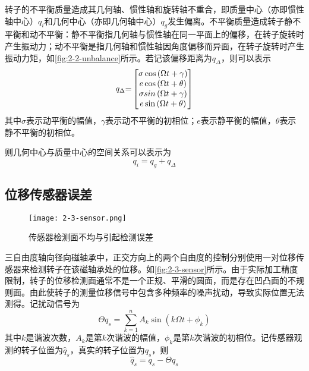 转子的不平衡质量造成其几何轴、惯性轴和旋转轴不重合，即质量中心（亦即惯性轴中心）$ q_i $和几何中心（亦即几何轴中心）$ q_g $发生偏离。不平衡质量造成转子静不平衡和动不平衡：静不平衡指几何轴与惯性轴在同一平面上的偏移，在转子旋转时产生振动力；动不平衡是指几何轴和惯性轴因角度偏移而异面，在转子旋转时产生振动力矩，如\autoref{fig:2-2-unbalance}所示。若记该偏移距离为$ q_{\Delta} $，则可以表示
\begin{equation}
\label{eq:q_delta}
{{q}_\Delta }{ = }\left[ 
{\begin{matrix}
   {\sigma \cos \left( {\Omega t + \gamma } \right)}  \cr 
   {e\cos \left( {\Omega t + \theta } \right)}  \cr 
   {\sigma sin\left( {\Omega t + \gamma } \right)}  \cr 
   {e\sin \left( {\Omega t + \theta } \right)}  \cr 
\end{matrix}} 
 \right]
\end{equation}
其中$\sigma$表示动平衡的幅值，$\gamma$表示动不平衡的初相位；$e$表示静平衡的幅值，$\theta$表示静不平衡的初相位。

则几何中心与质量中心的空间关系可以表示为
\begin{equation}
{{q}_i}{ = }{{q}_{g}} + {{q}_\Delta }
\end{equation}

\subsection{位移传感器误差}
\begin{figure}
	\texttt{[image: 2-3-sensor.png]}
	\caption{传感器检测面不均与引起检测误差}
	\label{fig:2-3-sensor}
\end{figure}
三自由度轴向径向磁轴承中，正交方向上的两个自由度的控制分别使用一对位移传感器来检测转子在该磁轴承处的位移。如\autoref{fig:2-3-sensor}所示。由于实际加工精度限制，转子的位移检测面通常不是一个正规、平滑的圆面，而是存在凹凸面的不规则面。由此使转子的测量位移信号中包含多种频率的噪声扰动，导致实际位置无法测得。记扰动信号为
\begin{equation}
\Theta {{q}_s} = \sum\limits_{k = 1}^n {{A_k}\sin \left( {k\Omega t + {\phi _k}} \right)} 
\end{equation}
其中$k$是谐波次数，$A_k$是第$k$次谐波的幅值，$\phi _k$是第$k$次谐波的初相位。记传感器观测的转子位置为${\hat q}_s$，真实的转子位置为$q_s$，则
\begin{equation}
{{\hat q}_s} = {{q}_s} - \Theta {{q}_s}
\end{equation}

